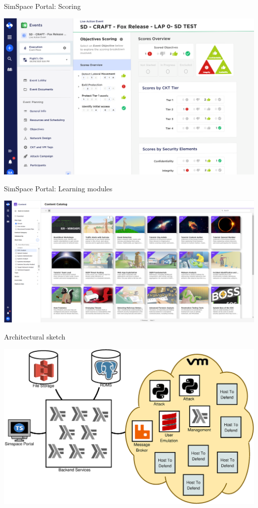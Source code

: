 \documentclass[aspectratio=169,ignorenonframetext]{beamer}
\begin{document}
\begin{frame}{SimSpace Portal: Scoring}
	\begin{center}
		\includegraphics[height=.6\textheight]{images/objective_scoring.png}
	\end{center}
\end{frame}

\begin{frame}{SimSpace Portal: Learning modules}
	\begin{center}
		\includegraphics[height=.6\textheight]{images/learning_paths.png}
	\end{center}
\end{frame}

\begin{frame}{Architectural sketch}
	\begin{center}
		\includegraphics[height=.6\textheight]{images/portal.eps}
	\end{center}
\end{frame}
\end{document}
